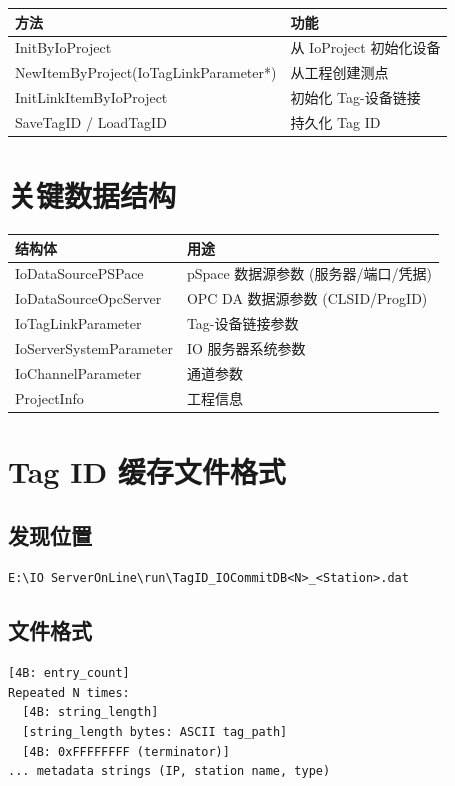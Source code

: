 \documentclass[12pt,a4paper]{ctexart}
\begin{document}
\begin{table}[H]\centering
\begin{tabular}{lp{7cm}}
\toprule
\textbf{方法} & \textbf{功能} \\
\midrule
InitByIoProject & 从 IoProject 初始化设备 \\
NewItemByProject(IoTagLinkParameter*) & 从工程创建测点 \\
InitLinkItemByIoProject & 初始化 Tag-设备链接 \\
SaveTagID / LoadTagID & 持久化 Tag ID \\
\bottomrule
\end{tabular}
\end{table}

\section{关键数据结构}

\begin{table}[H]\centering
\begin{tabular}{ll}
\toprule
\textbf{结构体} & \textbf{用途} \\
\midrule
IoDataSourcePSPace & pSpace 数据源参数 (服务器/端口/凭据) \\
IoDataSourceOpcServer & OPC DA 数据源参数 (CLSID/ProgID) \\
IoTagLinkParameter & Tag-设备链接参数 \\
IoServerSystemParameter & IO 服务器系统参数 \\
IoChannelParameter & 通道参数 \\
ProjectInfo & 工程信息 \\
\bottomrule
\end{tabular}
\end{table}

\section{Tag ID 缓存文件格式}

\subsection{发现位置}
\texttt{E:\textbackslash IO ServerOnLine\textbackslash run\textbackslash TagID\_IOCommitDB<N>\_<Station>.dat}

\subsection{文件格式}
\begin{verbatim}
[4B: entry_count]
Repeated N times:
  [4B: string_length]
  [string_length bytes: ASCII tag_path]
  [4B: 0xFFFFFFFF (terminator)]
... metadata strings (IP, station name, type)
\end{verbatim}
\end{document}
